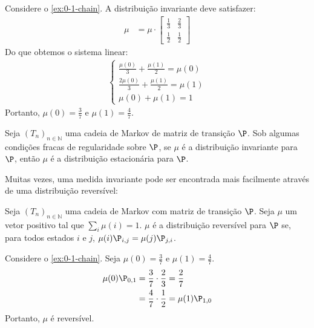 \begin{example}
 Considere o \cref{ex:0-1-chain}.
 A distribuição invariante deve satisfazer:
 \begin{align*}
  \mu &=
  \mu \cdot \begin{bmatrix}
   \frac{1}{3} & \frac{2}{3} \\
   \frac{1}{2} & \frac{1}{2}
  \end{bmatrix}
 \end{align*}
 Do que obtemos o sistema linear:
 \begin{align*}
  \begin{cases}
   \frac{\mu(0)}{3}+\frac{\mu(1)}{2} = \mu(0) \\
   \frac{2\mu(0)}{3}+\frac{\mu(1)}{2} = \mu(1) \\
   \mu(0) + \mu(1) = 1
  \end{cases}
 \end{align*}
 Portanto, $\mu(0) = \frac{3}{7}$ e
 $\mu(1) = \frac{4}{7}$.
\end{example}
      

\begin{theorem}
 Seja $(T_{n})_{n \in \mathbb{N}}$ uma
 cadeia de Markov de matriz de transição $\P$. 
 Sob algumas condições fracas de regularidade
 sobre $\P$, se $\mu$ é a
 distribuição invariante para $\P$, então
 $\mu$ é a distribuição estacionária para
 $\P$.
\end{theorem}

Muitas vezes, uma medida invariante
pode ser encontrada mais facilmente através de uma 
distribuição reversível:
      
\begin{definition}
 \label{defn:reversible}
 Seja $(T_{n})_{n \in \mathbb{N}}$ uma
 cadeia de Markov com
 matriz de transição $\P$. 
 Seja $\mu$ um vetor positivo tal que
 $\sum_{i}{\mu(i)} = 1$. 
 $\mu$ é a distribuição reversível para
 $\P$ se,  para todos estados $i$ e $j$,
 $\mu(i)\P_{i,j} = \mu(j)\P_{j,i}$. 
\end{definition}
      
\begin{example}
 Considere o \cref{ex:0-1-chain}. 
 Seja $\mu(0) = \frac{3}{7}$ e
 $\mu(1) = \frac{4}{7}$.
 \begin{align*}
  \mu(0) \P_{0,1}
  &= \frac{3}{7} \cdot \frac{2}{3}
  = \frac{2}{7} \\
  &= \frac{4}{7} \cdot \frac{1}{2}
  = \mu(1)\P_{1,0}
 \end{align*}
 Portanto, $\mu$ é reversível.
\end{example}
      
